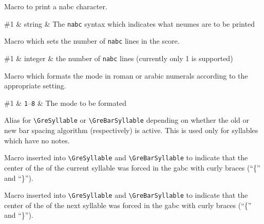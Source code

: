 Macro to print a nabc character.

\begin{argtable}
  \#1 & string & The \texttt{nabc} syntax which indicates what neumes are to be printed\\
\end{argtable}

Macro which sets the number of \texttt{nabc} lines in the score.

\begin{argtable}
  \#1 & integer & the number of \texttt{nabc} lines (currently only 1 is supported)\\
\end{argtable}


Macro which formats the mode in roman or arabic numerals according to the appropriate setting.

\begin{argtable}
  \#1 & \texttt{1}--\texttt{8} & The mode to be formated\\
\end{argtable}

Alias for \verb=\GreSyllable= or \verb=\GreBarSyllable= depending on whether the old or new bar spacing algorithm (respectively) is active.  This is used only for syllables which have no notes.

Macro inserted into \verb=\GreSyllable= and \verb=\GreBarSyllable= to indicate that the center of the of the current syllable was forced in the gabc with curly braces (``\{'' and ``\}'').

Macro inserted into \verb=\GreSyllable= and \verb=\GreBarSyllable= to indicate that the center of the of the next syllable was forced in the gabc with curly braces (``\{'' and ``\}'').


